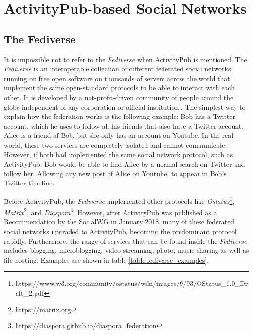 \section{ActivityPub-based Social Networks}

\subsection{The Fediverse}

It is impossible not to refer to the \emph{Fediverse} when ActivityPub is mentioned. The \emph{Fediverse} is an interoperable collection of different federated social networks running on free open software on thousands of servers across the world that implement the same open-standard protocols to be able to interact with each other. It is developed by a not-profit-driven community of people around the globe independent of any corporation or official institution \cite{holloway_2018} \cite{https://doi.org/10.48550/arxiv.1909.05801}. The simplest way to explain how the federation works is the following example: Bob has a Twitter account, which he uses to follow all his friends that also have a Twitter account. Alice is a friend of Bob, but she only has an account on Youtube. In the real world, these two services are completely isolated and cannot communicate. However, if both had implemented the same social network protocol, such as ActivityPub, Bob would be able to find Alice by a normal search on Twitter and follow her. Allowing any new post of Alice on Youtube, to appear in Bob's Twitter timeline.

Before ActivityPub, the \emph{Fediverse} implemented other protocols like \emph{Ostatus}\footnote{https://www.w3.org/community/ostatus/wiki/images/9/93/OStatus\_1.0\_Draft\_2.pdf}, \emph{Matrix}\footnote{https://matrix.org}, and \emph{Diaspora}\footnote{https://diaspora.github.io/diaspora\_federation}. However, after ActivityPub was published as a Recommendation by the SocialWG in January 2018, many of these federated social networks upgraded to ActivityPub, becoming the predominant protocol rapidly. Furthermore, the range of services that can be found inside the \emph{Fediverse} includes blogging, microblogging, video streaming, photo, music sharing as well as file hosting. Examples are shown in table \ref{table:fediverse_examples}.

